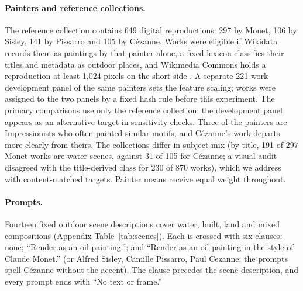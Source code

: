 \documentclass[10pt]{article}
\begin{document}
\paragraph{Painters and reference collections.}
The reference collection contains 649 digital reproductions: 297 by Monet, 106 by Sisley, 141 by
Pissarro and 105 by C\'ezanne. Works were eligible if Wikidata records them as paintings by that
painter alone, a fixed lexicon classifies their titles and metadata as outdoor places, and
Wikimedia Commons holds a reproduction at least 1,024 pixels on the short side
\citep{wikimediacommons,vrandecic2014wikidata}. A separate 221-work development panel of the same
painters sets the feature scaling; works were assigned to the two panels by a fixed hash rule
before this experiment. The primary comparisons use only the reference collection; the
development panel appears as an alternative target in sensitivity checks. Three of the painters
are Impressionists who often painted similar motifs, and C\'ezanne's work departs more clearly
from theirs. The collections differ in subject mix (by title, 191 of 297 Monet works are water
scenes, against 31 of 105 for C\'ezanne; a visual audit disagreed with the title-derived class
for 230 of 870 works), which we address with content-matched targets. Painter means receive
equal weight throughout.

\paragraph{Prompts.}
Fourteen fixed outdoor scene descriptions cover water, built, land and mixed compositions
(Appendix Table~\ref{tab:scenes}). Each is crossed with six clauses: none; ``Render as an oil
painting.''; and ``Render as an oil painting in the style of Claude Monet.'' (or Alfred Sisley,
Camille Pissarro, Paul Cezanne; the prompts spell C\'ezanne without the accent). The clause
precedes the scene description, and every prompt ends with ``No text or frame.''
\end{document}
